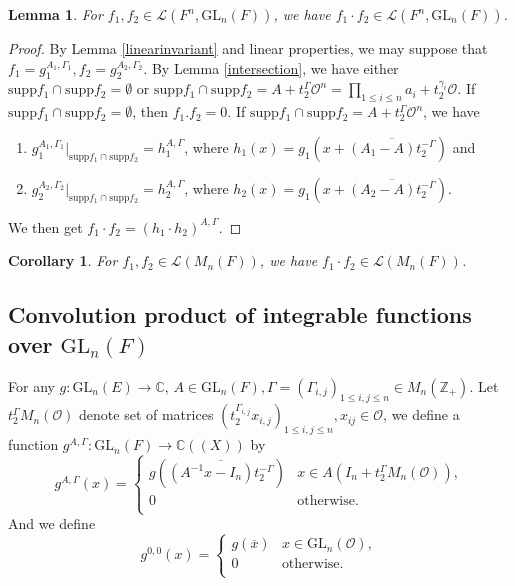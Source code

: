 \documentclass{amsart}
\newtheorem{lemma}[theorem]{Lemma}
\newtheorem{corollary}[theorem]{Corollary}
\theoremstyle{definition}
\theoremstyle{remark}
\numberwithin{equation}{section}
\def  \GL        {\mathrm{GL}}
\def  \supp     {\mathrm{supp}}
\def  \cl       {\mathcal{L}}
\def  \co       {\mathcal{O}}
\def  \bc       {\mathbb{C}}
\def  \bz       {\mathbb{Z}}
\begin{document}
\begin{lemma}\label{product}
	For $f_1 , f_2 \in \cl(F^n, \GL_n(F))$, we have $f_1\cdot  f_2 \in  \cl(F^n,  \GL_n(F))$.
\end{lemma}
\begin{proof}
 By Lemma \ref{linearinvariant} and linear properties, we may suppose that $f_1 = g_1^{A_1 , \Gamma_1}, f_2 = g_2^{A_2, \Gamma_2} $. By  Lemma \ref{intersection}, we have  either $\supp f_1 \cap   \supp f_2  = \emptyset $  or $\supp f_1 \cap \supp f_2 =A+ t_2^{\Gamma} \co^n= \prod_{1 \leq i \leq n} a_i + t_2^{\gamma_{i}} \co$. If $\supp f_1 \cap   \supp f_2 = \emptyset$, then $f_1 .f_2  =0$.     If $\supp f_1 \cap \supp f_2 = A+ t_2^{\Gamma} \co^n$, we have 
	\begin{enumerate}
		\item  $g_1 ^{A_1, \Gamma_1}|_{\supp f_1 \cap \supp f_2}   = h_{1}^{A, \Gamma}$, where $h_1(x) = g_1(x+  \overline{(A_1 -A) t_2^{-\Gamma}}) $  and
		\item $g_2 ^{A_2, \Gamma_2}|_{\supp f_1 \cap \supp f_2}   = h_{2}^{A, \Gamma}$, where $h_2(x) = g_1(x+  \overline{(A_2 -A) t_2^{-\Gamma}}) $.
	\end{enumerate}
	We then get $f_1\cdot f_2 = (h_1 \cdot h_2)^{A, \Gamma}$.
\end{proof}



\begin{corollary}  \label{productclosed}
	For $f_1,  f_2  \in \cl(M_n(F))$, we have $f_1 \cdot f_2  \in \cl(M_n(F))$.    
\end{corollary}


\vspace{1em}

\subsection{Convolution product of integrable functions over $\GL_n(F)$}


For any $g : \GL_n(E)  \to \bc $,  $A \in  \GL_n(F), \Gamma = (\Gamma_{i,j})_{1 \leq i,j  \leq n} \in M_n(\bz_{+})$. Let $t_2^{\Gamma} M_n(\co)$ denote set of matrices $(t_2^{\Gamma_{i,j}} x_{i,j })_{1\leq i, j \leq n }, x_{ij} \in \co$, we define a function $g^{A, \Gamma}: \GL_n(F) \to \bc((X))$ by 
$$
g^{A, \Gamma}(x) = \left\{
\begin{array}{ll}
	g\left(\overline{(A^{-1}x-I_n) t_2^{-\Gamma}}\right)  &   x   \in  A(I_n+t_2^{\Gamma} M_n(\co) ), \\
	0   &  \text{otherwise}.  \\  
\end{array}
\right.
$$
 And we define 
 $$
 g^{0, 0}(x) = \left\{
 \begin{array}{ll}
 	g(\overline{x}) &   x   \in  \GL_n(\co), \\
 	0   &  \text{otherwise}.  \\  
 \end{array}
 \right.
 $$
\end{document}
